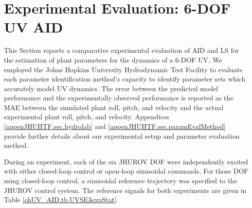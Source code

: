 \section{Experimental Evaluation: 6-\acs{DOF} \acs{UV} \acs{AID}}
\label{chUV_AID.sec.UVSE3exp}

This Section reports a comparative experimental evaluation of \ac{AID}
and \ac{LS} for the estimation of plant parameters for the
dynamics of a 6-\ac{DOF} \ac{UV}.
% 
We employed the Johns Hopkins University Hydrodynamic Test Facility to
evaluate each parameter identification method's capacity to identify
parameter sets which accurately model \ac{UV} dynamics.
%
The error between the predicted model performance and the
experimentally observed performance is reported as the \ac{MAE}
between the simulated plant roll, pitch, and velocity and the actual
experimental plant roll, pitch, and velocity.
%
Appendices \ref{appenJHUHTF.sec.hydrolab} and \ref{appenJHUHTF.sec.paramEvalMethod}
provide further details about our experimental setup and parameter
evaluation method.


During an experiment, each of the six \ac{JHUROV} \acl{DOF} were
independently excited with either closed-loop control or open-loop
sinusoidal commands. For those \ac{DOF} using closed-loop control, a
sinusoidal reference trajectory was specified to the \ac{JHUROV}
control system. The reference signals for both experiments are given
in Table \ref{chUV_AID.tb.UVSE3expStat}.




